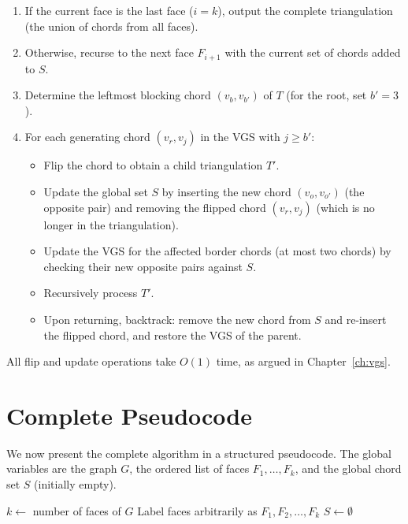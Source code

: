 \begin{enumerate}
    \item If the current face is the last face (\(i = k\)), output the complete triangulation (the union of chords from all faces).
    \item Otherwise, recurse to the next face \(F_{i+1}\) with the current set of chords added to \(S\).
    \item Determine the leftmost blocking chord \((v_b, v_{b'})\) of \(T\) (for the root, set \(b' = 3\)).
    \item For each generating chord \((v_r, v_j)\) in the VGS with \(j \ge b'\):
        \begin{itemize}
            \item Flip the chord to obtain a child triangulation \(T'\).
            \item Update the global set \(S\) by inserting the new chord \((v_o, v_{o'})\) (the opposite pair) and removing the flipped chord \((v_r, v_j)\) (which is no longer in the triangulation).
            \item Update the VGS for the affected border chords (at most two chords) by checking their new opposite pairs against \(S\).
            \item Recursively process \(T'\).
            \item Upon returning, backtrack: remove the new chord from \(S\) and re-insert the flipped chord, and restore the VGS of the parent.
        \end{itemize}
\end{enumerate}

All flip and update operations take \(O(1)\) time, as argued in Chapter~\ref{ch:vgs}.

\section{Complete Pseudocode}
\label{sec:pseudocode}

We now present the complete algorithm in a structured pseudocode. 
The global variables are the graph \(G\), the ordered list of faces \(F_1, \dots, F_k\), and the global chord set \(S\) (initially empty).

\begin{algorithm}[htbp]
    \caption{FindAllTriangulations (main)}
    \label{alg:main}
    \begin{algorithmic}[1]
            \State $k \gets$ number of faces of $G$
            \State Label faces arbitrarily as $F_1, F_2, \dots, F_k$
            \State $S \gets \emptyset$ 
            \State {}
        \EndProcedure
    \end{algorithmic}
\end{algorithm}

